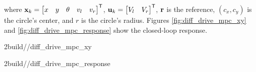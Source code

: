 where $\mathbf{x}_k = \begin{bmatrix}x & y & \theta & v_l & v_r\end{bmatrix}^\mathsf{T}$,
$\mathbf{u}_k = \begin{bmatrix}V_l & V_r\end{bmatrix}^\mathsf{T}$, $\mathbf{r}$ is the
reference, $(c_x, c_y)$ is the circle's center, and $r$ is the circle's radius.
Figures \ref{fig:diff_drive_mpc_xy} and \ref{fig:diff_drive_mpc_response} show
the closed-loop response.
\begin{bookfigure}
  \begin{minisvg}{2}{build/\chapterpath/diff_drive_mpc_xy}
    \caption{Differential drive MPC x-y plot}
    \label{fig:diff_drive_mpc_xy}
  \end{minisvg}
  \hfill
  \begin{minisvg}{2}{build/\chapterpath/diff_drive_mpc_response}
    \caption{Differential drive MPC response}
    \label{fig:diff_drive_mpc_response}
  \end{minisvg}
\end{bookfigure}
